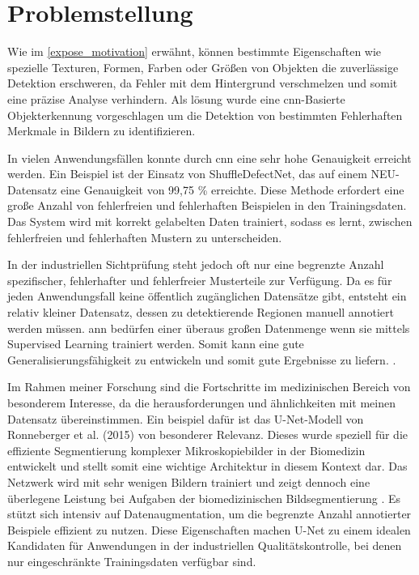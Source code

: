 \section{Problemstellung}\label{expose_problemstellung}

Wie im \ref{expose_motivation} erwähnt, können bestimmte Eigenschaften wie spezielle Texturen, Formen, Farben oder Größen von Objekten die zuverlässige Detektion erschweren, da Fehler mit dem Hintergrund verschmelzen und somit eine präzise Analyse verhindern. Als lösung wurde eine \gls{cnn}-Basierte Objekterkennung vorgeschlagen um die Detektion von bestimmten Fehlerhaften Merkmale in Bildern zu identifizieren.

In vielen Anwendungsfällen konnte durch \gls{cnn} eine sehr hohe Genauigkeit erreicht werden. Ein Beispiel ist der Einsatz von ShuffleDefectNet, das auf einem NEU-Datensatz eine Genauigkeit von 99,75 \% erreichte. Diese Methode erfordert eine große Anzahl von fehlerfreien und fehlerhaften Beispielen in den Trainingsdaten. Das System wird mit korrekt gelabelten Daten trainiert, sodass es lernt, zwischen fehlerfreien und fehlerhaften Mustern zu unterscheiden. \cite{saberironaghi_defect_2023}

In der industriellen Sichtprüfung steht jedoch oft nur eine begrenzte Anzahl spezifischer, fehlerhafter und fehlerfreier Musterteile zur Verfügung. Da es für jeden Anwendungsfall keine öffentlich zugänglichen Datensätze gibt, entsteht ein relativ kleiner Datensatz, dessen zu detektierende Regionen manuell annotiert werden müssen.
\gls{ann} bedürfen einer überaus großen Datenmenge wenn sie mittels Supervised Learning trainiert werden. Somit kann eine gute Generalisierungsfähigkeit zu entwickeln und somit gute Ergebnisse zu liefern. \cite{lecun_deep_2015}. 

Im Rahmen meiner Forschung sind die Fortschritte im medizinischen Bereich von besonderem Interesse, da die herausforderungen und ähnlichkeiten mit meinen Datensatz übereinstimmen. Ein beispiel dafür ist das U-Net-Modell von Ronneberger et al. (2015) \cite{ronneberger_u-net_2015} von besonderer Relevanz. Dieses wurde speziell für die effiziente Segmentierung komplexer Mikroskopiebilder in der Biomedizin entwickelt und stellt somit eine wichtige Architektur in diesem Kontext dar.
Das Netzwerk wird mit sehr wenigen Bildern trainiert und zeigt dennoch eine überlegene Leistung bei Aufgaben der biomedizinischen Bildsegmentierung \cite{ronneberger_u-net_2015}. 
Es stützt sich intensiv auf Datenaugmentation, um die begrenzte Anzahl annotierter Beispiele effizient zu nutzen.
Diese Eigenschaften machen U-Net zu einem idealen Kandidaten für Anwendungen in der industriellen Qualitätskontrolle, bei denen nur eingeschränkte Trainingsdaten verfügbar sind.

